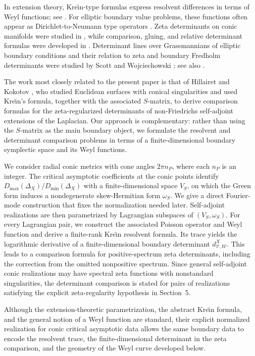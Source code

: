 \documentclass[12pt]{amsart}
\theoremstyle{plain}
\theoremstyle{definition}
\theoremstyle{remark}
\numberwithin{equation}{section} \numberwithin{figure}{section}
\newcommand{\mc}[1]{\mathcal{#1}}
\begin{document}
In extension theory, Kre\u{\i}n-type formulas express resolvent
differences in terms of Weyl functions; see \cite{dva}. For elliptic
boundary value problems, these functions often appear as
Dirichlet-to-Neumann type operators \cite{bjlm,bjlm2}. Zeta
determinants on conic manifolds were studied in \cite{LP,kk}, while
comparison, gluing, and relative determinant formulas were developed
in \cite{FR,bd,MW}. Determinant lines over Grassmannians of elliptic
boundary conditions and their relation to zeta and boundary Fredholm
determinants were studied by Scott and Wojciechowski
\cite{ScottWojciechowski1997,ScottWojciechowski2000}; see also
\cite{ScottRelativeZeta}.

The work most closely related to the present paper is that of
Hillairet and Kokotov \cite{HL}, who studied Euclidean surfaces with
conical singularities and used Kre\u{\i}n's formula, together with the
associated \(S\)-matrix, to derive comparison formulas for the
zeta-regularized determinants of non-Friedrichs self-adjoint
extensions of the Laplacian. Our approach is
complementary: rather than using the \(S\)-matrix as the main
boundary object, we formulate the resolvent and determinant
comparison problems in terms of a finite-dimensional boundary
symplectic space and its Weyl functions.

We consider radial conic metrics with cone angles \(2\pi n_P\), where
each \(n_P\) is an integer. The critical asymptotic coefficients at
the conic points identify
\(
    D_{\max}(\Delta_X)/
    D_{\min}(\Delta_X)
\)
with a finite-dimensional space \(V_S\), on which the Green form
induces a nondegenerate skew-Hermitian form \(\omega_S\). We give a
direct Fourier-mode construction that fixes the normalization needed
later. Self-adjoint realizations are then parametrized by Lagrangian
subspaces of \((V_S,\omega_S)\). For every Lagrangian pair, we
construct the associated Poisson operator and Weyl function and
derive a finite-rank Kre\u{\i}n resolvent formula. Its trace yields the
logarithmic derivative of a finite-dimensional boundary determinant
\(d_{\mc V,\mc W}^X\). This leads to a comparison formula for
positive-spectrum zeta determinants, including the correction from
the omitted nonpositive spectrum. Since general self-adjoint conic
realizations may have spectral zeta functions with nonstandard
singularities, the determinant comparison is stated for pairs of
realizations satisfying the explicit zeta-regularity hypothesis in
Section~5.

Although the extension-theoretic parametrization, the abstract
Kre\u{\i}n formula, and the general notion of a Weyl function are
standard, their explicit normalized realization for conic critical
asymptotic data allows the same boundary data to encode the resolvent
trace, the finite-dimensional determinant in the zeta comparison, and
the geometry of the Weyl curve developed below.
\end{document}
